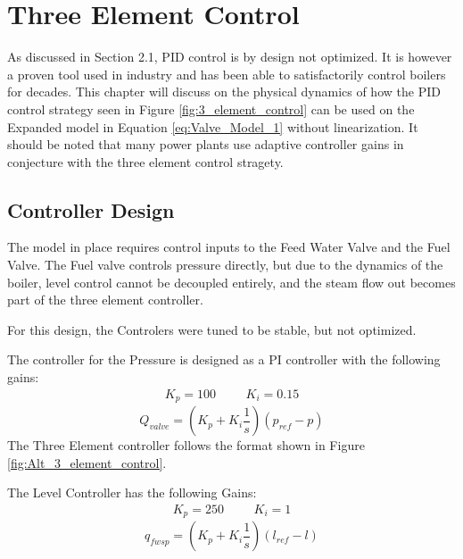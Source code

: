 \chapter{Three Element Control}

As discussed in Section 2.1, PID control is by design not optimized. It is however a proven tool used in industry and has been able to satisfactorily control boilers for decades. This chapter will discuss on the physical dynamics of how the PID control strategy seen in Figure \ref{fig:3_element_control} can be used on the Expanded model in Equation \ref{eq:Valve_Model_1} without linearization. It should be noted that many power plants use adaptive controller gains in conjecture with the three element control stragety. 


\section{Controller Design}

    The model in place requires control inputs to the Feed Water Valve and the Fuel Valve. The Fuel valve controls pressure directly, but due to the dynamics of the boiler, level control cannot be decoupled entirely, and the steam flow out becomes part of the three element controller. 
    
    For this design, the Controlers were tuned to be stable, but not optimized. 
    
    The controller for the Pressure is designed as a PI controller with the following gains:
    $$ \begin{matrix} K_p = 100   & & & K_i = 0.15 \end{matrix} $$
    \begin{equation}
        \label{eq:PID_Q_VALVE}
        Q_{valve} = \left( K_p + K_i \frac{1}{s} \right)\left( p_{ref} - p \right)
    \end{equation}
    The Three Element controller follows the format shown in Figure \ref{fig:Alt_3_element_control}. 
    
    The Level Controller has the following Gains:
    $$ \begin{matrix} K_p = 250   & & & K_i = 1 \end{matrix} $$
    \begin{equation}
        \label{eq:PID_FW_SP}
        q_{fw sp} = \left( K_p + K_i \frac{1}{s} \right)\left( l_{ref} - l \right)
    \end{equation}
    
